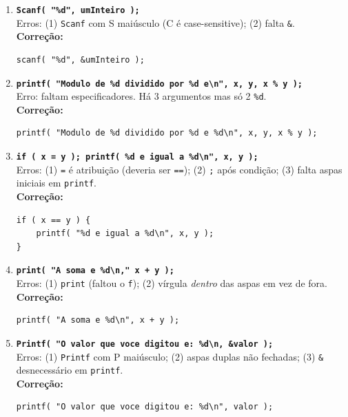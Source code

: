 \documentclass[12pt,a4paper]{article}
\begin{document}
\begin{respostabox}
\begin{enumerate}[label=\textbf{\alph*)}]
\item \textbf{\texttt{Scanf( "\%d", umInteiro );}}\\
Erros: (1) \texttt{Scanf} com S maiúsculo (C é case-sensitive); (2) falta \texttt{\&}.\\
\textbf{Correção:}
\begin{lstlisting}
scanf( "%d", &umInteiro );
\end{lstlisting}

\item \textbf{\texttt{printf( "Modulo de \%d dividido por \%d e\textbackslash n", x, y, x \% y );}}\\
Erro: faltam especificadores. Há 3 argumentos mas só 2 \texttt{\%d}.\\
\textbf{Correção:}
\begin{lstlisting}
printf( "Modulo de %d dividido por %d e %d\n", x, y, x % y );
\end{lstlisting}

\item \textbf{\texttt{if ( x = y ); printf( \%d e igual a \%d\textbackslash n", x, y );}}\\
Erros: (1) \texttt{=} é atribuição (deveria ser \texttt{==}); (2) \texttt{;} após
condição; (3) falta aspas iniciais em \texttt{printf}.\\
\textbf{Correção:}
\begin{lstlisting}
if ( x == y ) {
    printf( "%d e igual a %d\n", x, y );
}
\end{lstlisting}

\item \textbf{\texttt{print( "A soma e \%d\textbackslash n," x + y );}}\\
Erros: (1) \texttt{print} (faltou o \texttt{f}); (2) vírgula \textit{dentro} das aspas
em vez de fora.\\
\textbf{Correção:}
\begin{lstlisting}
printf( "A soma e %d\n", x + y );
\end{lstlisting}

\item \textbf{\texttt{Printf( "O valor que voce digitou e: \%d\textbackslash n, \&valor );}}\\
Erros: (1) \texttt{Printf} com P maiúsculo; (2) aspas duplas não fechadas; (3) \texttt{\&} desnecessário em \texttt{printf}.\\
\textbf{Correção:}
\begin{lstlisting}
printf( "O valor que voce digitou e: %d\n", valor );
\end{lstlisting}

\end{enumerate}
\end{respostabox}
\end{document}
